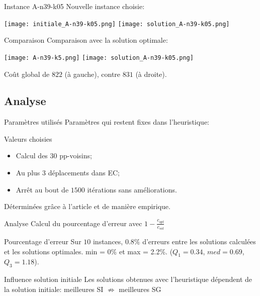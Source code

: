 \documentclass{beamer}
\begin{document}
\begin{frame}{Instance A-n39-k05}
Nouvelle instance choisie:
\begin{center}
\texttt{[image: initiale\_A-n39-k05.png]}
\texttt{[image: solution\_A-n39-k05.png]}
\end{center}

\end{frame}

\begin{frame}{Comparaison}
Comparaison avec la solution optimale:
\begin{center}
\texttt{[image: A-n39-k5.png]}
\texttt{[image: solution\_A-n39-k05.png]}
\end{center}
Coût global de $822$ (à gauche), contre $831$ (à droite).
\end{frame}

\subsection{Analyse}

\begin{frame}{Paramètres utilisés}
Paramètres qui restent fixes dans l'heuristique:
\begin{block}{Valeurs choisies}
\begin{itemize}
\item Calcul des 30 pp-voisins;
\item Au plus 3 déplacements dans EC;
\item Arrêt au bout de $1500$ itérations sans améliorations.
\end{itemize}
\end{block}
Déterminées grâce à l'article et de manière empirique.
\end{frame}

\begin{frame}{Analyse}
Calcul du pourcentage d'erreur avec $1-\frac{c_{opt}}{c_{sol}}$
\begin{exampleblock}{Pourcentage d'erreur}
Sur $10$ instances, $0.8\%$ d'erreurs entre les solutions calculées et les solutions optimales. min = 0\% et max = 2.2\%. ($Q_1 = 0.34$, $ med = 0.69$, $Q_3 = 1.18$). 
\end{exampleblock}

\begin{alertblock}{Influence solution initiale}
Les solutions obtenues avec l'heuristique dépendent de la solution initiale: meilleures SI $\nRightarrow$ meilleures SG 
\end{alertblock}

\end{frame}
\end{document}
